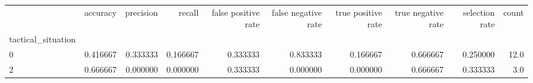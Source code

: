 \begin{tabular}{lrrrrrrrrr}
\toprule
{} &  accuracy &  precision &    recall &  false positive rate &  false negative rate &  true positive rate &  true negative rate &  selection rate &  count \\
tactical\_situation &           &            &           &                      &                      &                     &                     &                 &        \\
\midrule
0                  &  0.416667 &   0.333333 &  0.166667 &             0.333333 &             0.833333 &            0.166667 &            0.666667 &        0.250000 &   12.0 \\
2                  &  0.666667 &   0.000000 &  0.000000 &             0.333333 &             0.000000 &            0.000000 &            0.666667 &        0.333333 &    3.0 \\
\bottomrule
\end{tabular}
